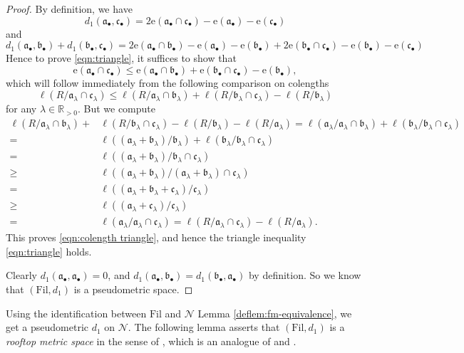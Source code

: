 \documentclass[11pt, leqno]{amsart}%
\theoremstyle{plain}
\theoremstyle{definition}
\theoremstyle{remark}
\newcommand{\cN}{\mathcal{N}}
\newcommand{\bR}{\mathbb{R}}
\newcommand{\fa}{\mathfrak{a}}
\newcommand{\fb}{\mathfrak{b}}
\newcommand{\fc}{\mathfrak{c}}
\newcommand{\e}{\mathrm{e}}
\newcommand{\Fil}{\mathrm{Fil}}
\numberwithin{equation}{section}
\begin{document}
\begin{proof}
    By definition, we have
    \[
        d_1(\fa_\bullet,\fc_\bullet)=
        2\e(\fa_\bullet\cap\fc_\bullet)-\e(\fa_\bullet)-\e(\fc_\bullet)
    \]
    and 
    \[
        d_1(\fa_\bullet,\fb_\bullet)+
        d_1(\fb_\bullet,\fc_\bullet)=
        2\e(\fa_\bullet\cap\fb_\bullet)-\e(\fa_\bullet)-\e(\fb_\bullet)+2\e(\fb_\bullet\cap\fc_\bullet)-\e(\fb_\bullet)-\e(\fc_\bullet)
    \]
    Hence to prove \eqref{eqn:triangle}, it suffices to show that
    \[
        \e(\fa_\bullet\cap\fc_\bullet)\le \e(\fa_\bullet\cap\fb_\bullet)+\e(\fb_\bullet\cap\fc_\bullet)-\e(\fb_\bullet),
    \]
    which will follow immediately from the following comparison on colengths
    \begin{equation}\label{eqn:colength triangle}
        \ell(R/\fa_\lambda\cap\fc_\lambda)\le \ell(R/\fa_\lambda\cap\fb_\lambda)+\ell(R/\fb_\lambda\cap\fc_\lambda)-\ell(R/\fb_\lambda)
    \end{equation}
    for any $\lambda\in\bR_{>0}$. But we compute
    \begin{align*}
        \ell(R/\fa_\lambda\cap\fb_\lambda)+
        &\ell(R/\fb_\lambda\cap\fc_\lambda)-\ell(R/\fb_\lambda)-\ell(R/\fa_\lambda)=\ell(\fa_\lambda/\fa_\lambda\cap\fb_\lambda)+\ell(\fb_\lambda/\fb_\lambda\cap\fc_\lambda)\\
        =&\ell((\fa_\lambda+\fb_\lambda)/\fb_\lambda)+\ell(\fb_\lambda/\fb_\lambda\cap\fc_\lambda)\\
        =&\ell((\fa_\lambda+\fb_\lambda)/\fb_\lambda\cap\fc_\lambda)\\
        \ge&\ell((\fa_\lambda+\fb_\lambda)/(\fa_\lambda+\fb_\lambda)\cap\fc_\lambda)\\
        =&\ell((\fa_\lambda+\fb_\lambda+\fc_\lambda)/\fc_\lambda)\\
        \ge&\ell((\fa_\lambda+\fc_\lambda)/\fc_\lambda)\\
        =&\ell(\fa_\lambda/\fa_\lambda\cap\fc_\lambda)=\ell(R/\fa_\lambda\cap\fc_\lambda)-\ell(R/\fa_\lambda).
    \end{align*}
    This proves \eqref{eqn:colength triangle}, and hence the triangle inequality \eqref{eqn:triangle} holds. 
	
    Clearly $d_1(\fa_\bullet,\fa_\bullet)=0$, and $d_1(\fa_\bullet,\fb_\bullet)=d_1(\fb_\bullet,\fa_\bullet)$ by definition. So we know that $(\Fil,d_1)$ is a pseudometric space.
\end{proof}

Using the identification between $\Fil$ and $\cN$ Lemma \ref{deflem:fm-equivalence}, we get a pseudometric $d_1$ on $\cN$. The following lemma asserts that $(\Fil,d_1)$ is a \emph{rooftop metric space} in the sense of \cite{Xia19}, which is an analogue of \cite[Proposition 3.35]{Dar19} and \cite[Lemma 3.2]{BJ21}.
\end{document}
